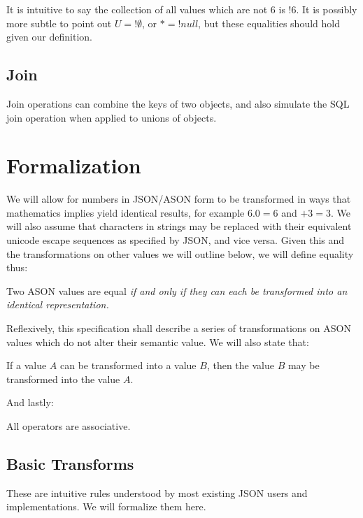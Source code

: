 \documentclass[letterpaper]{article}
\begin{document}
It is intuitive to say the collection of all values which are not \(6\) is
\(!6\). It is possibly more subtle to point out \(U = !\emptyset\), or \(* =
!null\), but these equalities should hold given our definition.

\subsection{Join}
Join operations can combine the keys of two objects, and also simulate the SQL
join operation when applied to unions of objects.

\section{Formalization}
\begin{samepage}
We will allow for numbers in JSON/ASON form to be transformed in ways that
mathematics implies yield identical results, for example \(6.0 = 6\) and \(+3 =
3\). We will also assume that characters in strings may be replaced with their
equivalent unicode escape sequences as specified by JSON, and vice versa.
Given this and the transformations on other values we will outline below, we
will define equality thus:
%
\begin{prule}
Two ASON values are equal \em if and only if \em they can each be transformed
into an identical representation.
\end{prule}
\end{samepage}

\begin{samepage}
Reflexively, this specification shall describe a series of transformations on
ASON values which do not alter their semantic value. We will also state that:
%
\begin{prule}
\label{sec:commute}
If a value \(A\) can be transformed into a value \(B\), then the value \(B\)
may be transformed into the value \(A\).
\end{prule}
\end{samepage}

And lastly:
%
\begin{prule}
\label{sec:assoc}
All operators are associative.
\end{prule}

\subsection{Basic Transforms}
These are intuitive rules understood by most existing JSON users and
implementations. We will formalize them here.
\end{document}
